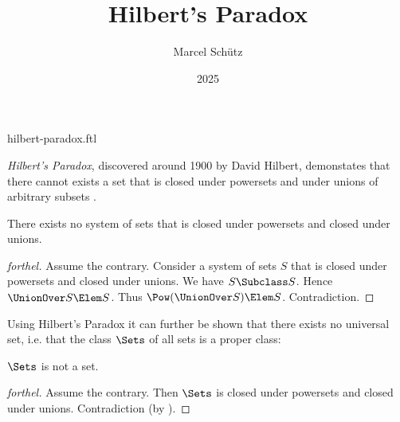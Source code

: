 \documentclass{stex}
\title{Hilbert's Paradox}
\author{Marcel Schütz}
\date{2025}
\begin{document}
\begin{smodule}{hilbert-paradox.ftl}



\maketitle

\noindent \emph{Hilbert's Paradox}, discovered around 1900 by David Hilbert, 
demonstates that there cannot exists a set that is closed under powersets and 
under unions of arbitrary subsets \cite{PeckhausKahl2002}.

\begin{theorem}[forthel,title=Hilbert's Paradox,name=Hilbert Paradox]
  There exists no system of sets that is closed under powersets and closed under unions.
\end{theorem}
\begin{proof}[forthel]
  Assume the contrary.
  Consider a system of sets $S$ that is closed under powersets and closed under unions.
  We have $S \Subclass S$.
  Hence $\UnionOver S \Elem S$.
  Thus $\Pow(\UnionOver S) \Elem S$.
  Contradiction.
\end{proof}

\noindent Using Hilbert's Paradox it can further be shown that there exists 
no universal set, i.e. that the class $\Sets$ of all sets is a proper class:

\begin{corollary}[forthel]
  $\Sets$ is not a set.
\end{corollary}
\begin{proof}[forthel]
  Assume the contrary.
  Then $\Sets$ is closed under powersets and closed under unions.
  Contradiction (by ).
\end{proof}

\printbibliography
{}

\end{smodule}
\end{document}
